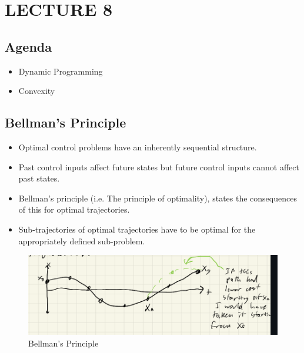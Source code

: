 \newpage
\section{LECTURE 8}

\subsection{Agenda}
\begin{itemize}
    \item Dynamic Programming
    \item Convexity
\end{itemize}

\subsection{Bellman's Principle}
\begin{itemize}
    \item Optimal control problems have an inherently sequential structure. 
    \item Past control inputs affect future states but future control inputs cannot affect past states. 
    \item Bellman's principle (i.e. The principle of optimality), states the consequences of this for optimal trajectories. 
    \item Sub-trajectories of optimal trajectories have to be optimal for the appropriately defined sub-problem.
\end{itemize}

\begin{figure}
    \centering
    \includegraphics[width=0.4\linewidth]{L8_Images/F1.PNG}
    \caption{Bellman's Principle}
    \label{fig:l8f1}
\end{figure}

